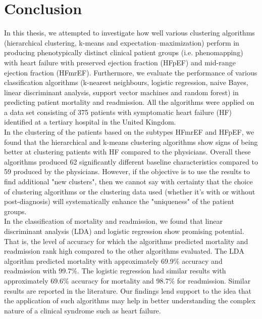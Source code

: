 \documentclass[../thesis.tex]{subfiles}
\begin{document}
\chapter{Conclusion}
\label{chap:conc}

\noindent In this thesis, we attempted to investigate how well various clustering algorithms (hierarchical clustering, k-means and expectation–maximization) perform in producing phenotypically distinct clinical patient groups (i.e. phenomapping) with heart failure with preserved ejection fraction (HFpEF) and mid-range ejection fraction (HFmrEF). Furthermore, we evaluate the performance of various classification algorithms (k-nearest neighbours, logistic regression, naive Bayes, linear discriminant analysis, support vector machines and random forest) in predicting patient mortality and readmission. All the algorithms were applied on a data set consisting of 375 patients with symptomatic heart failure (HF) identified at a tertiary hospital in the United Kingdom.\\
\indent In the clustering of the patients based on the subtypes HFmrEF and HFpEF, we found that the hierarchical and k-means clustering algorithms show signs of being better at clustering patients with HF compared to the physicians. Overall these algorithms produced 62 significantly different baseline characteristics compared to 59 produced by the physicians. However, if the objective is to use the results to find additional "new clusters", then we cannot say with certainty that the choice of clustering algorithms or the clustering data used (whether it's with or without post-diagnosis) will systematically enhance the "uniqueness" of the patient groups.\\
\indent In the classification of mortality and readmission, we found that linear discriminant analysis (LDA) and logistic regression show promising potential. That is, the level of accuracy for which the algorithms predicted mortality and readmission rank high compared to the other algorithms evaluated. The LDA algorithm predicted mortality with approximately 69.9\% accuracy and readmission with 99.7\%. The logistic regression had similar results with approximately 69.6\% accuracy for mortality and 98.7\% for readmission. Similar results are reported in the literature. Our findings lend support to the idea that the application of such algorithms may help in better understanding the complex nature of a clinical syndrome such as heart failure.
\end{document}
